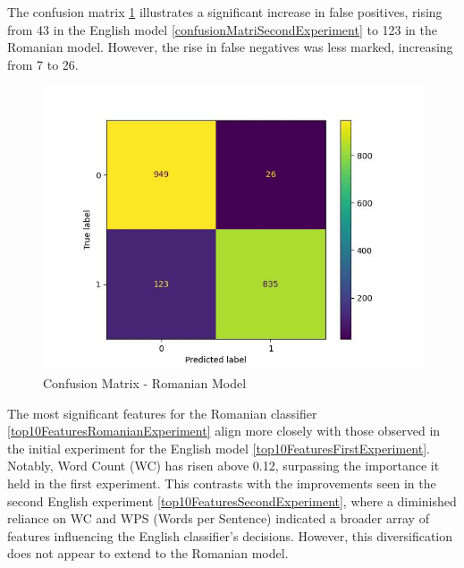 The confusion matrix \ref{confusionMatrixRomanianExperiment} illustrates a significant increase in false positives, rising from 43 in the English model \ref{confusionMatriSecondExperiment} to 123 in the Romanian model. However, the rise in false negatives was less marked, increasing from 7 to 26.

\begin{figure}[htbp]
	\centering
		\includegraphics[scale=0.8]{LaTeX Bachelor Thesis Depression Signs Detection/figures/metrics/experimentRomanian/confusionMatrix.jpg}
	\caption{Confusion Matrix - Romanian Model}
	\label{confusionMatrixRomanianExperiment}
\end{figure}



The most significant features for the Romanian classifier \ref{top10FeaturesRomanianExperiment} align more closely with those observed in the initial experiment for the English model \ref{top10FeaturesFirstExperiment}. Notably, Word Count (WC) has risen above 0.12, surpassing the importance it held in the first experiment. This contrasts with the improvements seen in the second English experiment \ref{top10FeaturesSecondExperiment}, where a diminished reliance on WC and WPS (Words per Sentence) indicated a broader array of features influencing the English classifier’s decisions. However, this diversification does not appear to extend to the Romanian model.


